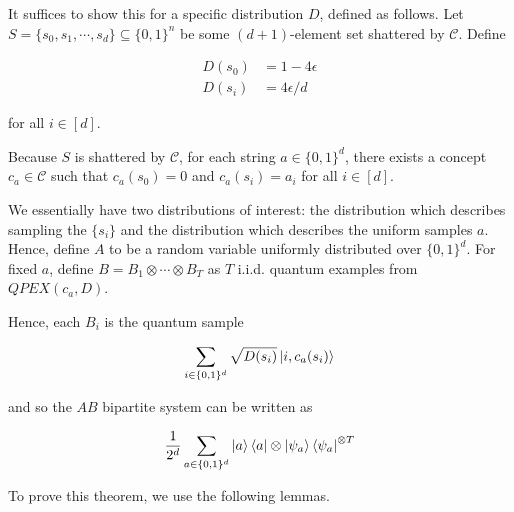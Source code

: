 \documentclass[main.tex]{subfiles}
\begin{document}
It suffices to show this for a specific distribution $D$, defined as follows. Let $S = \{s_0,s_1,\cdots,s_d\} \subseteq \{0,1\}^n$ be some $(d + 1)$-element set shattered by $\mathcal{C}$. Define 

\begin{align}
D(s_0) &= 1-4\epsilon\\
D(s_i) &= 4\epsilon/d 	
\end{align}

for all $i \in [d]$.

Because $S$ is shattered by $\mathcal{C}$, for each string $a \in \{0, 1\}^d$, there exists a concept $c_a \in \mathcal{C}$ such that $c_a(s_0) = 0$ and $c_a(s_i) = a_i$ for all $i \in [d]$.

We essentially have two distributions of interest: the distribution which describes sampling the $\{ s_i\}$ and the distribution which describes the uniform samples $a$. Hence, define $A$ to be a random variable uniformly distributed over $\{0, 1\}^d$. For fixed $a$, define $B = B_1 \otimes \cdots \otimes B_T$ as $T$ i.i.d. quantum examples from $QPEX(c_a, D)$. 

Hence, each $B_i$ is the quantum sample

\begin{align*}
\sum_{i \in \{ 0,1\}^d} \sqrt{D(s_i)} \ket{i, c_a(s_i)}	
\end{align*}

and so the $AB$ bipartite system can be written as

\begin{align*}
	\frac{1}{2^d} \sum_{a \in \{0,1\}^d} \ket{a}\bra{a} \otimes \ket{\psi_a} \bra{\psi_a}^{\otimes T}
\end{align*}

To prove this theorem, we use the following lemmas.
\end{document}
